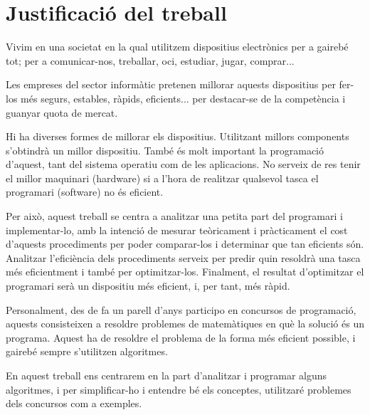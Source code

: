 \section*{Justificació del treball}
Vivim en una societat en la qual utilitzem dispositius electrònics per a gairebé tot; per a comunicar-nos, treballar, oci, estudiar, jugar, comprar... 

Les empreses del sector informàtic pretenen millorar aquests dispositius per fer-los més segurs, estables, ràpids, eficients... per destacar-se de la competència i guanyar quota de mercat. 

Hi ha diverses formes de millorar els dispositius. Utilitzant millors components s'obtindrà un millor dispositiu. També és molt important la programació d'aquest, tant del sistema operatiu com de les aplicacions. No serveix de res tenir el millor maquinari (hardware)  si a l'hora de realitzar qualsevol tasca el programari (software) no és eficient.

Per això, aquest treball se centra a analitzar una petita part del programari i implementar-lo, amb la intenció de mesurar teòricament i pràcticament el cost d'aquests procediments per poder comparar-los i determinar que tan eficients són. Analitzar l'eficiència dels procediments serveix per predir quin resoldrà una tasca més eficientment i també per optimitzar-los. Finalment, el resultat d'optimitzar el programari serà un dispositiu més eficient, i, per tant, més ràpid.

Personalment, des de fa un parell d'anys participo en concursos de programació, aquests consisteixen a resoldre problemes de matemàtiques en què la solució és un programa. Aquest ha de resoldre el problema de la forma més eficient possible, i gairebé sempre s'utilitzen algoritmes.

En aquest treball ens centrarem en la part d'analitzar i programar alguns algoritmes, i per simplificar-ho i entendre bé els conceptes, utilitzaré problemes dels concursos com a exemples.


